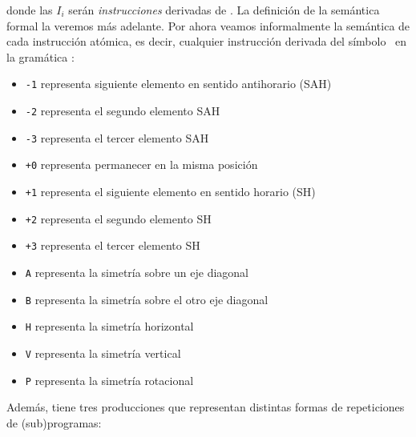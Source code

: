 \noindent donde las $I_i$ serán {\em instrucciones} derivadas de \inst. La definición de la semántica formal la veremos más adelante.  Por ahora veamos informalmente la semántica de cada instrucción atómica, es decir, cualquier instrucción derivada del símbolo \atom\ en la gramática \gramgeo: 
\begin{itemize}
\item \verb#-1# representa siguiente elemento en sentido antihorario (SAH)

\item \verb#-2# representa el segundo elemento SAH

\item \verb#-3# representa el tercer elemento SAH 

\item \verb#+0# representa permanecer en la misma posición

\item \verb#+1# representa el siguiente elemento en sentido horario (SH)
 
\item \verb#+2# representa el segundo elemento SH

\item \verb#+3# representa el tercer elemento SH 

\item \verb#A# representa la simetría sobre un eje diagonal

\item \verb#B# representa la simetría sobre el otro eje diagonal 

\item \verb#H# representa la simetría horizontal 

\item \verb#V# representa la simetría vertical 

\item \verb#P# representa la simetría rotacional 
\end{itemize}

Además, \gramgeo tiene tres producciones que representan distintas formas de repeticiones de (sub)programas:

